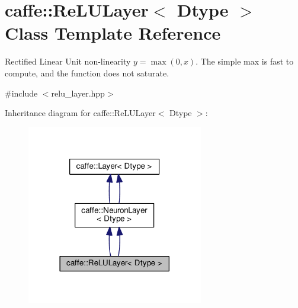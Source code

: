 \hypertarget{classcaffe_1_1_re_l_u_layer}{}\section{caffe\+:\+:Re\+L\+U\+Layer$<$ Dtype $>$ Class Template Reference}
\label{classcaffe_1_1_re_l_u_layer}


Rectified Linear Unit non-\/linearity $ y = \max(0, x) $. The simple max is fast to compute, and the function does not saturate.  




{\ttfamily \#include $<$relu\+\_\+layer.\+hpp$>$}



Inheritance diagram for caffe\+:\+:Re\+L\+U\+Layer$<$ Dtype $>$\+:
\nopagebreak
\begin{figure}[H]
\begin{center}
\leavevmode
\includegraphics[width=218pt]{classcaffe_1_1_re_l_u_layer__inherit__graph}
\end{center}
\end{figure}
